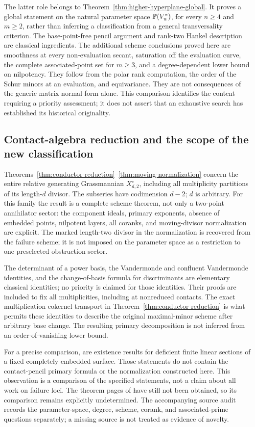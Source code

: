 The latter role belongs to
Theorem~\ref{thm:higher-hyperplane-global}. It proves a global statement
on the natural parameter space $\mathbb P(V_n^*)$, for every $n\ge4$ and
$m\ge2$, rather than inferring a classification from a general
transversality criterion. The base-point-free pencil argument and
rank-two Hankel description are classical ingredients. The additional
scheme conclusions proved here are smoothness at every non-evaluation
secant, saturation off the evaluation curve, the complete associated-point
set for $m\ge3$, and a degree-dependent lower bound on nilpotency.
They follow from the polar rank computation, the order of the Schur
minors at an evaluation, and equivariance. They are not consequences
of the generic matrix normal form alone. This comparison identifies
the content requiring a priority assessment; it does not assert that
an exhaustive search has established its historical originality.


\subsection{Contact-algebra reduction and the scope of the new classification}
Theorems~\ref{thm:conductor-reduction}--\ref{thm:moving-normalization}
concern the entire relative generating Grassmannian
$X_{d,2}^\circ$, including all multiplicity partitions of its
length-$d$ divisor. The subseries have codimension $d-2$; $d$ is
arbitrary. For this family the result is a complete scheme theorem,
not only a two-point annihilator sector: the component ideals,
primary exponents, absence of embedded points, nilpotent layers,
all coranks, and moving-divisor normalization are explicit.
The marked length-two divisor in the normalization is recovered
from the failure scheme; it is not imposed on the parameter space
as a restriction to one preselected obstruction sector.

The determinant of a power basis, the Vandermonde and confluent
Vandermonde identities, and the change-of-basis formula for
discriminants are elementary classical identities; no priority is
claimed for those identities. Their proofs are included to fix all
multiplicities, including at nonreduced contacts. The exact
multiplication-cokernel transport in
Theorem~\ref{thm:conductor-reduction} is what permits these identities
to describe the original maximal-minor scheme after arbitrary
base change. The resulting primary decomposition is not inferred
from an order-of-vanishing lower bound.

For a precise comparison, \cite[Theorem 0.2 and Proposition 2.2]{Ballico96}
are existence results for deficient finite linear sections of a
fixed completely embedded surface. Those statements do not contain
the contact-pencil primary formula or the normalization constructed
here. This observation is a comparison of the specified statements,
not a claim about all work on failure loci. The theorem pages of
\cite{Ballico93} have still not been obtained, so its comparison
remains explicitly undetermined. The accompanying source audit
records the parameter-space, degree, scheme, corank, and associated-prime
questions separately; a missing source is not treated as evidence
of novelty.

